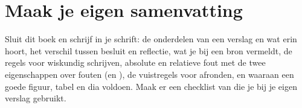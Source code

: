 
\ifzelfstudie
\section*{Maak je eigen samenvatting}
Sluit dit boek en schrijf in je schrift: de onderdelen van een verslag en wat erin hoort, het verschil tussen besluit en reflectie, wat je bij een bron vermeldt, de regels voor wiskundig schrijven, absolute en relatieve fout met de twee eigenschappen over fouten (en ), de vuistregels voor afronden, en waaraan een goede figuur, tabel en dia voldoen. Maak er een checklist van die je bij je eigen verslag gebruikt.
\fi
